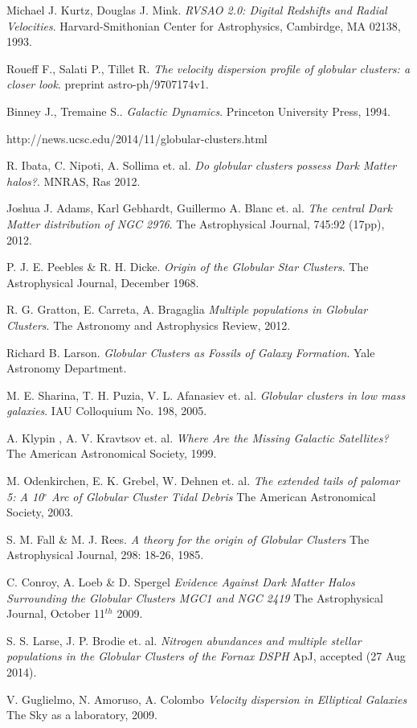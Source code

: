 \documentclass[a4paper, 11pt, oneside]{Thesis}  %
\begin{document}
\begin{thebibliography}{9}


Michael J. Kurtz, Douglas J. Mink. 
\textit{RVSAO 2.0: Digital Redshifts and Radial Velocities}. 
Harvard-Smithonian Center for Astrophysics, Cambirdge, MA 02138, 1993.

Roueff F., Salati P., Tillet R. 
\textit{The velocity dispersion profile of globular clusters: a closer look}. 
preprint astro-ph/9707174v1.

Binney J., Tremaine S.. 
\textit{Galactic Dynamics}. 
Princeton University Press, 1994.

http://news.ucsc.edu/2014/11/globular-clusters.html

R. Ibata, C. Nipoti, A. Sollima et. al. 
\textit{Do globular clusters possess Dark Matter halos?}.
MNRAS, Ras 2012.

Joshua J. Adams, Karl Gebhardt, Guillermo A. Blanc et. al. 
\textit{The central Dark Matter distribution of NGC 2976}.
The Astrophysical Journal, 745:92 (17pp), 2012.

P. J. E. Peebles \& R. H. Dicke. 
\textit{Origin of the Globular Star Clusters}.
The Astrophysical Journal, December 1968.

R. G. Gratton, E. Carreta, A. Bragaglia
\textit{Multiple populations in Globular Clusters}.
The Astronomy and Astrophysics Review, 2012.

Richard B. Larson.
\textit{Globular Clusters as Fossils of Galaxy Formation}.
Yale Astronomy Department.

M. E. Sharina, T. H. Puzia, V. L. Afanasiev et. al.
\textit{Globular clusters in low mass galaxies}.
IAU Colloquium No. 198, 2005.

A. Klypin , A. V. Kravtsov et. al. 
\textit{Where Are the Missing Galactic Satellites?} 
The American Astronomical Society, 1999. 

M. Odenkirchen, E. K. Grebel, W. Dehnen et. al.
\textit{The extended tails of palomar 5: A 10$^{\circ}$ Arc of Globular Cluster Tidal Debris}
The American Astronomical Society, 2003.

S. M. Fall \& M. J. Rees.
\textit{A theory for the origin of Globular Clusters}
The Astrophysical Journal, 298: 18-26, 1985.

C. Conroy, A. Loeb \& D. Spergel
\textit{Evidence Against Dark Matter Halos Surrounding the Globular Clusters MGC1 and NGC 2419}
The Astrophysical Journal, October 11$^{th}$ 2009.

S. S. Larse, J. P. Brodie et. al.
\textit{Nitrogen abundances and multiple stellar populations in the Globular Clusters of the Fornax DSPH}
ApJ, accepted (27 Aug 2014).

V. Guglielmo, N. Amoruso, A. Colombo
\textit{Velocity dispersion in Elliptical Galaxies}
The Sky as a laboratory, 2009.

\end{thebibliography}
\end{document}
